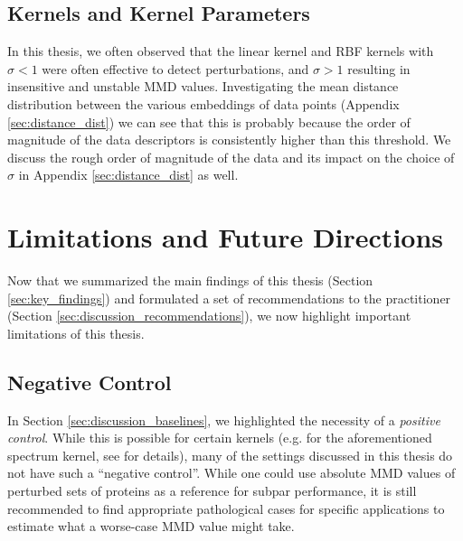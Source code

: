 \subsection{Kernels and Kernel Parameters}
In this thesis, we often observed that the linear kernel and RBF kernels with
$\sigma<1$ were often effective to detect perturbations, and $\sigma>1$
resulting in insensitive and unstable MMD values. Investigating the mean
distance distribution between the various embeddings of data points (Appendix
\ref{sec:distance_dist}) we can see that this is probably because the order of
magnitude of the data descriptors is consistently higher than this threshold. We
discuss the rough order of magnitude of the data and its impact on the choice of
$\sigma$ in Appendix \ref{sec:distance_dist} as well.

\section{Limitations and Future Directions}\label{sec:discussion_limitations}

Now that we summarized the main findings of this thesis (Section
\ref{sec:key_findings}) and formulated a set of recommendations to the
practitioner (Section \ref{sec:discussion_recommendations}), we now highlight
important limitations of this thesis.


\subsection{Negative Control}

In Section \ref{sec:discussion_baselines}, we highlighted the necessity of a
\emph{positive control}. While this is possible for certain kernels (e.g. for
the aforementioned spectrum kernel, see \cite{kucera2021conditional} for
details), many of the settings discussed in this thesis do not have such a
``negative control''. While one could use absolute MMD values of perturbed sets
of proteins as a reference for subpar performance, it is still recommended to find
appropriate pathological cases for specific applications to estimate what a worse-case
MMD value might take.


